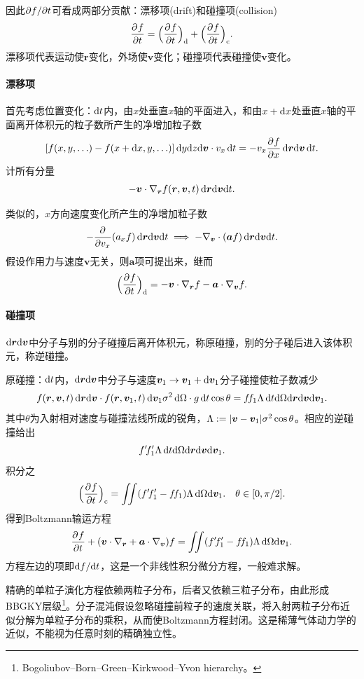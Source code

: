 因此$\p f/\p t$可看成两部分贡献：漂移项(drift)和碰撞项(collision)
\begin{align}
	\pv ft = \Bigp{\pv ft}_\mathrm{d} + \Bigp{\pv ft}_\mathrm{c}.
\end{align}
漂移项代表运动使$\bm r$变化，外场使$\bm v$变化；碰撞项代表碰撞使$\bm v$变化。
\paragraph{漂移项}首先考虑位置变化：$\d t$内，由$x$处垂直$x$轴的平面进入，和由$x + \d x$处垂直$x$轴的平面离开体积元的粒子数所产生的净增加粒子数
\[
	[f(x,y,\ldots) - f(x + \d x,y,\ldots)]\d y\nd z\nd\bm v \cdot v_x\d t = -v_x\pv fx\d\bm r\nd\bm v\d t.
\]
计所有分量
\[
	-\bm v \cdot \grad_{\bm r}f(\bm r,\bm v,t)\d\bm r\nd\bm v\nd t.
\]

类似的，$x$方向速度变化所产生的净增加粒子数
\[
	-\pp{v_x}(a_xf)\d\bm r\nd\bm v\nd t \implies -\nabla_{\bm v} \cdot (\bm a f)\d\bm r\nd\bm v\nd t.
\]
假设作用力与速度$\bm v$无关，则$\bm a$项可提出来，继而
\begin{align}
	\Bigp{\pv ft}_\mathrm{d} = -\bm v \cdot \grad_{\bm r}f - \bm a \cdot \grad_{\bm v}f.
\end{align}
\paragraph{碰撞项}$\d\bm r\nd\bm v$中分子与别的分子碰撞后离开体积元，称原碰撞，别的分子碰后进入该体积元，称逆碰撞。

原碰撞：$\d t$内，$\d\bm r\nd\bm v$中分子与速度$\bm v_1 \to \bm v_1 + \d\bm v_1$分子碰撞使粒子数减少
\[
	f(\bm r,\bm v,t)\d\bm r\nd\bm v \cdot f(\bm r,\bm v_1,t)\d\bm v_1\sigma^2\d\Omega \cdot g\d t\cos\theta = f\!f_1\Lambda\d t\nd\Omega\nd\bm r\nd\bm v\nd\bm v_1.
\]
其中$\theta$为入射相对速度与碰撞法线所成的锐角，$\Lambda := \abs{\bm v - \bm v_1}\sigma^2\cos\theta$。相应的逆碰撞给出
\[
	f'\!f_1'\Lambda\d t\nd\Omega\nd\bm r\nd\bm v\nd\bm v_1.
\]
积分之
\begin{align}
	\Bigp{\pv ft}_\mathrm{c} = \iint(f'\!f_1' - f\!f_1)\Lambda\d\Omega\nd\bm v_1.\quad\theta \in [0,\pi/2].
\end{align}
得到Boltzmann输运方程
\begin{align}
	\pv ft + (\bm v \cdot \grad_{\bm r} + \bm a \cdot \grad_{\bm v})f = \iint(f'\!f_1' - f\!f_1)\Lambda\d\Omega\nd\bm v_1.
\end{align}
方程左边的项即$\d f/\nd t$，这是一个非线性积分微分方程，一般难求解。

精确的单粒子演化方程依赖两粒子分布，后者又依赖三粒子分布，由此形成BBGKY层级\footnote{Bogoliubov--Born--Green--Kirkwood--Yvon hierarchy。}。分子混沌假设忽略碰撞前粒子的速度关联，将入射两粒子分布近似分解为单粒子分布的乘积，从而使Boltzmann方程封闭。这是稀薄气体动力学的近似，不能视为任意时刻的精确独立性。
